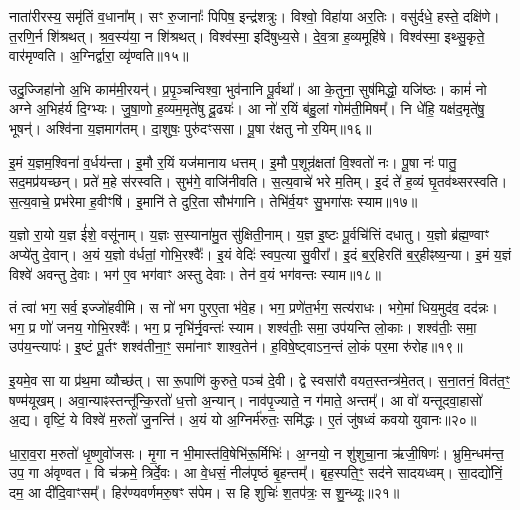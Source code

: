 नाता॑रीरस्य॒ समृ॑तिं व॒धाना᳚म्।
सꣳ रु॒जानाः᳚ पिपिष॒ इन्द्र॑शत्रुः।
विश्वो॒ विहा॑या अर॒तिः।
वसु॑र्दधे॒ हस्ते॒ दक्षि॑णे।
त॒रणि॒र्न शि॑श्रथत्।
श्र॒व॒स्य॑या॒ न शि॑श्रथत्।
विश्व॑स्मा॒ इदि॑षुध्य॒से।
दे॒व॒त्रा ह॒व्यमूहि॑षे।
विश्व॑स्मा॒ इथ्सु॒कृते॒ वार॑मृण्वति।
अ॒ग्निर्द्वारा॒ व्यृ॑ण्वति॥१५॥\ip

उदु॒ज्जिहा॑नो अ॒भि काम॑मी॒रयन्॑।
प्र॒पृ॒ञ्चन्विश्वा॒ भुव॑नानि पू॒र्वथा᳚।
आ के॒तुना॒ सुष॑मिद्धो॒ यजि॑ष्ठः।
कामं॑ नो अग्ने अ॒भिह॑र्य दि॒ग्भ्यः।
जु॒षा॒णो ह॒व्यम॒मृते॑षु दू॒ढ्यः॑।
आ नो॑ र॒यिं ब॑हु॒लां गोम॑ती॒मिषम्᳚।
नि धे॑हि॒ यक्ष॑द॒मृते॑षु॒ भूषन्॑।
अश्वि॑ना य॒ज्ञमाग॑तम्।
दा॒शुषः॒ पुरु॑दꣳससा।
पू॒षा र॑क्षतु नो र॒यिम्॥१६॥\ip

इ॒मं य॒ज्ञम॒श्विना॑ व॒र्धय॑न्ता।
इ॒मौ र॒यिं यज॑मानाय धत्तम्।
इ॒मौ प॒शून्र॑क्षतां वि॒श्वतो॑ नः।
पू॒षा नः॑ पातु॒ सद॒मप्र॑यच्छन्।
प्रते॑ म॒हे स॑रस्वति।
सुभ॑गे॒ वाजि॑नीवति।
स॒त्य॒वाचे॑ भरे म॒तिम्।
इ॒दं ते॑ ह॒व्यं घृ॒तव॑थ्सरस्वति।
स॒त्य॒वाचे॒ प्रभ॑रेमा ह॒वीꣳषि॑।
इ॒मानि॑ ते दुरि॒ता सौभ॑गानि।
तेभि॑र्व॒यꣳ सु॒भगा॑सः स्याम॥१७॥\ip\anuvakamend[व॒ज्र्यही॑नामृजी॒षं व्यृ॑ण्वति रक्षतु नो र॒यिꣳ सौभ॑गा॒न्येकं॑ च]

य॒ज्ञो रा॒यो य॒ज्ञ ई॑शे॒ वसू॑नाम्।
य॒ज्ञः स॒स्याना॑मु॒त सु॑क्षिती॒नाम्।
य॒ज्ञ इ॒ष्टः पू॒र्वचि॑त्तिं दधातु।
य॒ज्ञो ब्र॑ह्म॒ण्वाꣳ अप्ये॑तु दे॒वान्।
अ॒यं य॒ज्ञो व॑र्धतां॒ गोभि॒रश्वैः᳚।
इ॒यं वेदिः॑ स्वप॒त्या सु॒वीरा᳚।
इ॒दं ब॒र्॒हिरति॑ ब॒र्॒हीꣴष्य॒न्या।
इ॒मं य॒ज्ञं विश्वे॑ अवन्तु दे॒वाः।
भग॑ ए॒व भग॑वाꣳ अस्तु देवाः।
तेन॑ व॒यं भग॑वन्तः स्याम॥१८॥\ip

तं त्वा॑ भग॒ सर्व॒ इज्जो॑हवीमि।
स नो॑ भग पुरए॒ता भ॑वे॒ह।
भग॒ प्रणे॑त॒र्भग॒ सत्य॑राधः।
भगे॒मां धिय॒मुद॑व॒ दद॑न्नः।
भग॒ प्र णो॑ जनय॒ गोभि॒रश्वैः᳚।
भग॒ प्र नृभि॑र्नृ॒वन्तः॑ स्याम।
शश्व॑तीः॒ समा॒ उप॑यन्ति लो॒काः।
शश्व॑तीः॒ समा॒ उप॑य॒न्त्यापः॑।
इ॒ष्टं पू॒र्तꣳ शश्व॑तीना॒ꣳ॒ समा॑नाꣳ शाश्व॒तेन॑।
ह॒विषे॒ष्ट्वा\-ऽन॒न्तं लो॒कं पर॒मा रु॑रोह॥१९॥\ip

इ॒यमे॒व सा या प्र॑थ॒मा व्यौच्छ॑त्।
सा रू॒पाणि॑ कुरुते॒ पञ्च॑ दे॒वी।
द्वे स्वसा॑रौ वयत॒स्तन्त्र॑मे॒तत्।
स॒ना॒तनं॒ वित॑त॒ꣳ॒ षण्म॑यूखम्।
अवा॒न्याꣴस्तन्तू᳚न्कि॒रतो॑ ध॒त्तो अ॒न्यान्।
नाव॑पृ॒ज्याते॒ न ग॑माते॒ अन्तम्᳚।
आ वो॑ यन्तूदवा॒हासो॑ अ॒द्य।
वृष्टिं॒ ये विश्वे॑ म॒रुतो॑ जु॒नन्ति॑।
अ॒यं यो अ॒ग्निर्म॑रुतः॒ समि॑द्धः।
ए॒तं जु॑षध्वं कवयो युवानः॥२०॥\ip

धा॒रा॒व॒रा म॒रुतो॑ धृ॒ष्णुवो॑जसः।
मृ॒गा न भी॒मास्त॑वि॒षेभि॑\-रू॒र्मिभिः॑।
अ॒ग्नयो॒ न शु॑शुचा॒ना ऋ॑जी॒षिणः॑।
भ्रुमि॒न्धम॑न्त॒ उप॒ गा अ॑वृण्वत।
वि च॑क्रमे॒ त्रिर्दे॒वः।
आ वे॒धसं॒ नील॑पृष्ठं बृ॒हन्तम्᳚।
बृह॒स्पति॒ꣳ॒ सद॑ने सादयध्वम्।
सा॒दद्यो॑निं॒ दम॒ आ दी॑दि॒वाꣳसम्᳚।
हिर॑ण्यवर्णमरु॒षꣳ स॑पेम।
स हि शुचिः॑ श॒तप॑त्रः॒ स शु॒न्ध्यूः॥२१॥\ip

